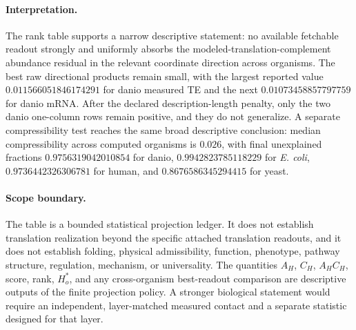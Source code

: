 \paragraph{Interpretation.}
The rank table supports a narrow descriptive statement: no available fetchable readout strongly and uniformly absorbs the modeled-translation-complement abundance residual in the relevant coordinate direction across organisms.  The best raw directional products remain small, with the largest reported value $0.011566051846174291$ for danio measured TE and the next $0.01073458857797759$ for danio mRNA.  After the declared description-length penalty, only the two danio one-column rows remain positive, and they do not generalize.  A separate compressibility test reaches the same broad descriptive conclusion: median compressibility across computed organisms is $0.026$, with final unexplained fractions $0.9756319042010854$ for danio, $0.9942823785118229$ for \emph{E. coli}, $0.9736442326306781$ for human, and $0.8676586345294415$ for yeast.

\paragraph{Scope boundary.}
The table is a bounded statistical projection ledger.  It does not establish translation realization beyond the specific attached translation readouts, and it does not establish folding, physical admissibility, function, phenotype, pathway structure, regulation, mechanism, or universality.  The quantities $A_H$, $C_H$, $A_HC_H$, score, rank, $H_o^\ast$, and any cross-organism best-readout comparison are descriptive outputs of the finite projection policy.  A stronger biological statement would require an independent, layer-matched measured contact and a separate statistic designed for that layer.

